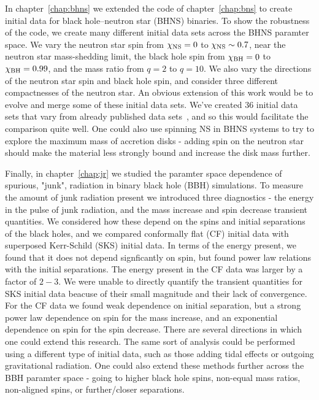 In chapter~\ref{chap:bhns} we extended the code of chapter~\ref{chap:bns} to create initial data for black hole--neutron star (BHNS) binaries. To show the robustness of the code, we create many different initial data sets across the BHNS paramter space. We vary the neutron star spin from $\chi_{\rm NS}=0$ to $\chi_{\rm NS}\sim 0.7$, near the neutron star mass-shedding limit, the black hole spin from $\chi_{\rm BH}=0$ to $\chi_{\rm BH}=0.99$, and the mass ratio from $q=2$ to $q=10$. We also vary the directions of the neutron star spin and black hole spin, and consider three different compactnesses of the neutron star. An obvious extension of this work would be to evolve and merge some of these initial data sets. We've created 36 initial data sets that vary from already published data sets~\citep{Foucart:2013a}, and so this would facilitate the comparison quite well. One could also use spinning NS in BHNS systems to try to explore the maximum mass of accretion disks - adding spin on the neutron star should make the material less strongly bound and increase the disk mass further.

Finally, in chapter~\ref{chap:jr} we studied the paramter space dependence of spurious, "junk", radiation in binary black hole (BBH) simulations. To measure the amount of junk radiation present we introduced three diagnostics - the energy in the pulse of junk radiation, and the mass increase and spin decrease transient quantities. We considered how these depend on the spins and initial separations of the black holes, and we compared conformally flat (CF) initial data with superposed Kerr-Schild (SKS) initial data. In terms of the energy present, we found that it does not depend signficantly on spin, but found power law relations with the initial separations. The energy present in the CF data was larger by a factor of $2-3$. We were unable to directly quantify the transient quantities for SKS initial data beacuse of their small magnitude and their lack of convergence. For the CF data we found weak dependence on initial separation, but a strong power law dependence on spin for the mass increase, and an exponential dependence on spin for the spin decrease. There are several directions in which one could extend this research. The same sort of analysis could be performed using a different type of initial data, such as those adding tidal effects or outgoing gravitational radiation. One could also extend these methods further across the BBH paramter space - going to higher black hole spins, non-equal mass ratios, non-aligned spins, or further/closer separations.
